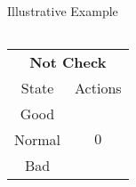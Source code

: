 \documentclass[usenames,dvipsnames,aspectratio=169,11pt, envcountsect]{beamer}
\begin{document}
\begin{frame}{Illustrative Example}
\begin{table}[H]
\begin{minipage}{0.29\textwidth}
\begin{tabular}{c | c}
			\end{tabular}
			\vspace{0.5cm} %
		\end{minipage}\hspace{0.5cm} %
		\begin{minipage}{0.29\textwidth}
			\centering
			\begin{tabular}{c | c}
				\multicolumn{2}{c}{\textbf{Not Check}} \\
				State  & Actions                       \\
				\hline
				Good   & \multirow{3}{*}{ \( 0 \)}     \\
				Normal &                               \\
				Bad    &                               \\
			\end{tabular}
			\vspace{0.5cm} %
		\end{minipage}
	\end{table}

\end{frame}
\end{document}
